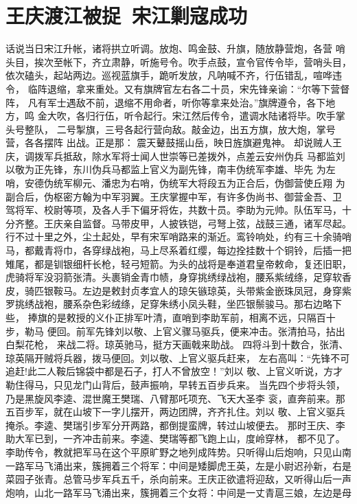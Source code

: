 \chapter{王庆渡江被捉~宋江剿寇成功}

话说当日宋江升帐，诸将拱立听调。放炮、鸣金鼓、升旗，随放静营炮，各营
哨头目，挨次至帐下，齐立肃静，听施号令。吹手点鼓，宣令官传令毕，营哨头目，
依次磕头，起站两边。巡视蓝旗手，跪听发放，凡呐喊不齐，行伍错乱，喧哗违令，
临阵退缩，拿来重处。又有旗牌官左右各二十员，宋先锋亲谕：“尔等下营督阵，
凡有军士遇敌不前，退缩不用命者，听你等拿来处治。”旗牌遵令，各下地方，鸣
金大吹，各归行伍，听令起行。宋江然后传令，遣调水陆诸将毕。吹手掌头号整队，
二号掣旗，三号各起行营向敌。敲金边，出五方旗，放大炮，掌号营，各各摆阵
出战。正是那：
震天鼙鼓摇山岳，映日旌旗避鬼神。
却说贼人王庆，调拨军兵抵敌，除水军将士闻人世崇等已差拨外，点差云安州伪兵
马都监刘以敬为正先锋，东川伪兵马都监上官义为副先锋，南丰伪统军李雄、毕先
为左哨，安德伪统军柳元、潘忠为右哨，伪统军大将段五为正合后，伪御营使丘翔
为副合后，伪枢密方翰为中军羽翼。王庆掌握中军，有许多伪尚书、御营金吾、卫
驾将军、校尉等项，及各人手下偏牙将佐，共数十员。李助为元帅。队伍军马，十
分齐整。王庆亲自监督。马带皮甲，人披铁铠，弓弩上弦，战鼓三通，诸军尽起。
行不过十里之外，尘土起处，早有宋军哨路来的渐近。鸾铃响处，约有三十余骑哨
马，都戴青将巾，各穿绿战袍，马上尽系着红缨，每边拴挂数十个铜铃，后插一把
雉尾，都是钏银细杆长枪，轻弓短箭。为头的战将是奉道君皇帝敕命，复还旧职，
虎骑将军没羽箭张清。头裹销金青巾帻，身穿挑绣绿战袍，腰系紫绒绦，足穿软香
皮，骑匹银鞍马。左边是敕封贞孝宜人的琼矢镞琼英，头带紫金嵌珠凤冠，身穿紫
罗挑绣战袍，腰系杂色彩绒绦，足穿朱绣小凤头鞋，坐匹银鬃骏马。那右边略下些，
捧旗的是敕授的义仆正排军叶清，直哨到李助军前，相离不远，只隔百十步，勒马
便回。前军先锋刘以敬、上官义骤马驱兵，便来冲击。张清拍马，拈出白梨花枪，
来战二将。琼英驰马，挺方天画戟来助战。
四将斗到十数合，张清、琼英隔开贼将兵器，拨马便回。刘以敬、上官义驱兵赶来，
左右高叫：“先锋不可追赶!此二人鞍后锦袋中都是石子，打人不曾放空！”刘以
敬、上官义听说，方才勒住得马，只见龙门山背后，鼓声振响，早转五百步兵来。
当先四个步将头领，乃是黑旋风李逵、混世魔王樊瑞、八臂那吒项充、飞天大圣李
衮，直奔前来。那五百步军，就在山坡下一字儿摆开，两边团牌，齐齐扎住。刘以
敬、上官义驱兵掩杀。李逵、樊瑞引步军分开两路，都倒提蛮牌，转过山坡便去。
那时王庆、李助大军已到，一齐冲击前来。李逵、樊瑞等都飞跑上山，度岭穿林，
都不见了。
李助传令，教就把军马在这个平原旷野之地列成阵势。只听得山后炮响，只见山南
一路军马飞涌出来，簇拥着三个将军：中间是矮脚虎王英，左是小尉迟孙新，右是
菜园子张青。总管马步军兵五千，杀向前来。王庆正欲遣将迎敌，又听得山后一声
炮响，山北一路军马飞涌出来，簇拥着三个女将：中间是一丈青扈三娘，左边是母
